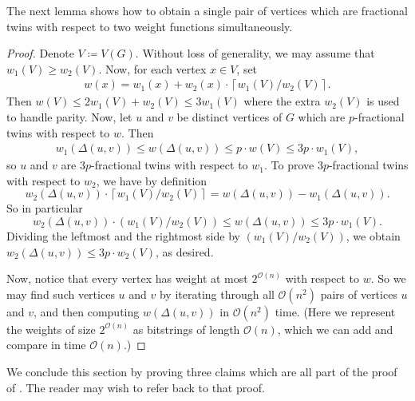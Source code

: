 \documentclass[11pt]{article}
\theoremstyle{definition}
\renewcommand{\leq}{\leqslant}
\renewcommand{\geq}{\geqslant}
\begin{document}
The next lemma shows how to obtain a single pair of vertices which are fractional twins with respect to two weight functions simultaneously.

\twoWeightFunctions*
\begin{proof}
    Denote $V\coloneqq V(G)$. Without loss of generality, we may assume that $w_1(V) \geq w_2(V)$. Now, for each vertex $x \in V$, set \begin{align*} w(x) = w_1(x)+w_2(x) \cdot \left\lceil {w_1(V)}/{w_2(V)}\right\rceil.\end{align*}Then $w(V)\leq 2w_1(V)+w_2(V)\leq 3 w_1(V)$ where the extra $w_2(V)$ is used to handle parity. Now, let $u$ and $v$ be distinct vertices of $G$ which are $p$-fractional twins with respect to $w$. Then \begin{align*} w_1(\Delta(u,v)) \leq w(\Delta(u,v))\leq p\cdot w(V) \leq 3p\cdot w_1(V),\end{align*} so $u$ and $v$ are $3p$-fractional twins with respect to $w_1$. To prove $3p$-fractional twins with respect to $w_2$, we have by definition 
    \[
      w_2(\Delta(u,v)) \cdot \left\lceil {w_1(V)}/{w_2(V)}\right\rceil = w(\Delta(u,v)) - w_1(\Delta(u,v)).
    \]
    So in particular
    \[
      w_2(\Delta(u,v))\cdot \left( {w_1(V)}/{w_2(V)}\right) \leq w(\Delta(u,v))\leq 3p\cdot w_1(V).
    \]
    Dividing the leftmost and the rightmost side by $\left( {w_1(V)}/{w_2(V)}\right)$, we obtain $w_2(\Delta(u,v)) \leq 3p\cdot w_2(V)$,
    as desired.

    Now, notice that every vertex has weight at most $2^{\mathcal{O}(n)}$ with respect to $w$. So we may find such vertices $u$ and $v$ by iterating through all $\mathcal{O}(n^2)$ pairs of vertices $u$ and $v$, and then computing $w(\Delta(u,v))$ in $\mathcal{O}(n^2)$ time. (Here we represent the weights of size $2^{\mathcal{O}(n)}$ as bitstrings of length $\mathcal{O}(n)$, which we can add and compare in time $\mathcal{O}(n)$.)
\end{proof} 

We conclude this section by proving three claims which are all part of the proof of . The reader may wish to refer back to that proof.
\end{document}
